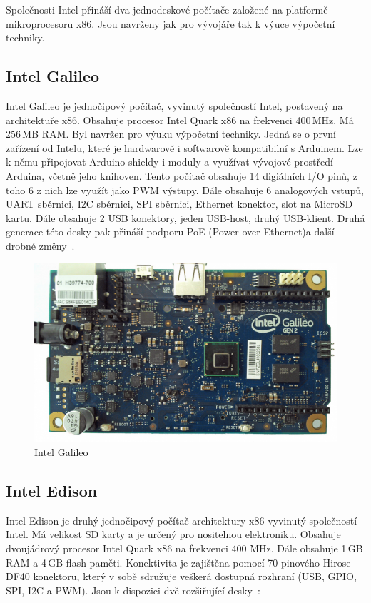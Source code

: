 Společnosti Intel přináší dva jednodeskové počítače založené na platformě mikroprocesoru x86. Jsou navrženy jak pro vývojáře tak k výuce výpočetní techniky.

		\subsection{Intel Galileo}
		Intel Galileo je jednočipový počítač, vyvinutý společností Intel, postavený na architektuře x86. Obsahuje procesor Intel Quark x86 na frekvenci 400\,MHz. Má 256\,MB RAM. Byl navržen pro výuku výpočetní techniky. Jedná se o první zařízení od Intelu, které je hardwarově i softwarově kompatibilní s Arduinem. Lze k němu připojovat Arduino shieldy i moduly a využívat vývojové prostředí Arduina, včetně jeho knihoven. 
		Tento počítač obsahuje 14 digiálních I/O pinů, z toho 6 z nich lze využít jako PWM výstupy. Dále obsahuje 6 analogových vstupů, UART sběrnici, I2C sběrnici, SPI sběrnici, Ethernet konektor, slot na MicroSD kartu. Dále obsahuje 2 USB konektory, jeden USB-host, druhý USB-klient. Druhá generace této desky pak přináší podporu PoE (Power over Ethernet)a další drobné změny~\cite{IntelGalileo,ArduinoGalileo}.
\begin{figure}[!ht]
  \begin{center}
    \includegraphics[scale=0.45]{obrazky/embed_intel_galileo}
  \end{center}
  \caption{Intel Galileo~\cite{IntelGalileo}}
\end{figure}
		
		
		\subsection{Intel Edison} 
		Intel Edison je druhý jednočipový počítač architektury x86 vyvinutý společností Intel. Má velikost SD karty a je určený pro nositelnou elektroniku. Obsahuje dvoujádrový procesor Intel Quark x86 na frekvenci 400 MHz. Dále obsahuje 1\,GB RAM a 4\,GB flash paměti. Konektivita je zajištěna pomocí 70 pinového Hirose DF40 konektoru, který v sobě sdružuje veškerá dostupná rozhraní (USB, GPIO, SPI, I2C a PWM). Jsou k dispozici dvě rozšiřující desky~\cite{IntelEdison}:
			
